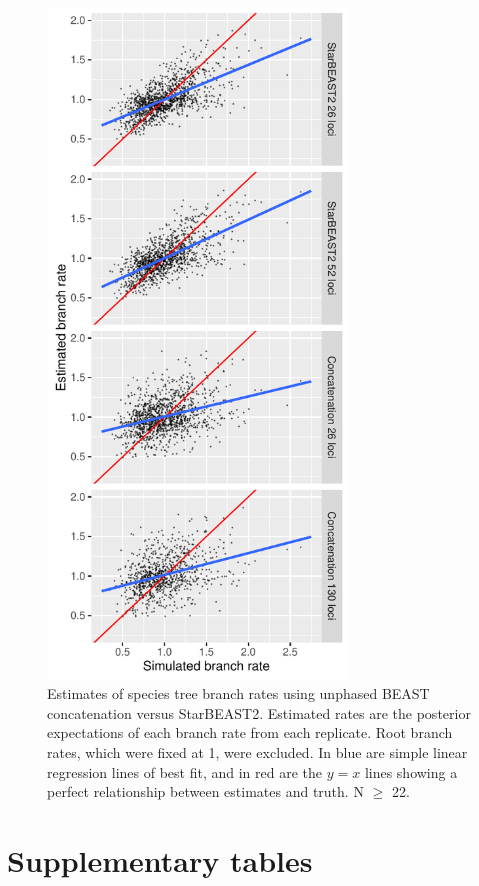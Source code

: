 \documentclass[12pt]{article}
\begin{document}
\clearpage

\begin{figure}[htb!]
\centering
\includegraphics[width=80mm]{branch_rates_unphased.pdf}
\caption
{Estimates of species tree branch rates using unphased BEAST concatenation versus
StarBEAST2. Estimated rates are the posterior expectations of each branch rate
from each replicate. Root branch rates, which were fixed at 1, were excluded.
In blue are simple linear regression lines of best fit, and in red are the $y
= x$ lines showing a perfect relationship between estimates and truth. N $\ge$
22.}
\label{fig:unphasedBranchRates}
\end{figure}

\clearpage

\section{Supplementary tables}
\end{document}
